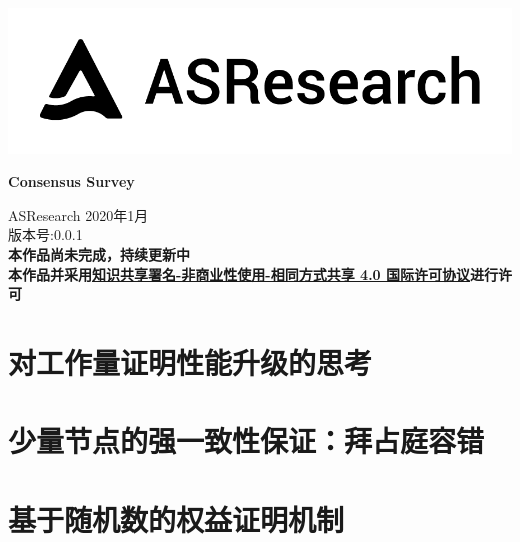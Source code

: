 \documentclass[12pt]{article}
\begin{document}
\pagestyle{empty}
\renewcommand{\contentsname}{目录}
\renewcommand{\abstractname}{摘要}
\renewcommand{\refname}{参考文献}
\renewcommand{\figurename}{图}
\renewcommand{\tablename}{表}
\renewcommand{\baselinestretch}{1.5}
\renewcommand{\appendixname}{附录}
\renewcommand{\proofname}{证明}

\pagecolor{\pcolor}

\begin{titlepage}
  \begin{center}
    \vspace*{5.5cm}
    \includegraphics[scale=0.5]{../common/logo.png}
    \vspace{0.5cm}

  \textbf{\huge{Consensus Survey}}

    \vspace{0.5cm}
    ASResearch
    \vfill
    2020年1月 \\
    版本号:0.0.1\\
    \textbf{本作品尚未完成，持续更新中\\本作品并采用\href{http://creativecommons.org/licenses/by-nc-sa/4.0/}{知识共享署名-非商业性使用-相同方式共享 4.0 国际许可协议}进行许可}
  \end{center}

\end{titlepage}
\setcounter{page}{0}
\tableofcontents
\newpage
\setcounter{page}{1}
\pagestyle{fancy}
\vspace*{0.01cm}


\part{对工作量证明性能升级的思考}


%
\part{少量节点的强一致性保证：拜占庭容错}



\part{基于随机数的权益证明机制}



%
%
%
%
%
%
\newpage


\newpage
%
%
\end{document}

